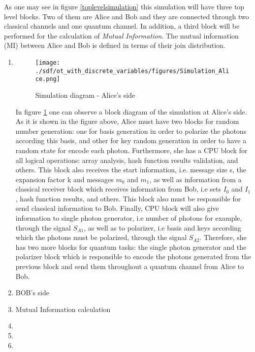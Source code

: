 As one may see in figure \ref{toplevelsimulation} this simulation will have three top level blocks. Two of them are Alice and Bob and they are connected through two classical channels and one quantum channel. In addition, a third block will be performed for the calculation of \textit{Mutual Information}. The mutual information (MI) between Alice and Bob is defined in terms of their join distribution.


\begin{enumerate}
  \item

  \begin{figure}[h]
	\centering
	\texttt{[image: ./sdf/ot\_with\_discrete\_variables/figures/Simulation\_Alice.png]}
	\caption{Simulation diagram - Alice's side}\label{simulationalice}
\end{figure}

    In figure \ref{simulationalice} one can observe a block diagram of the simulation at Alice's side. As it is shown in the figure above, Alice must have two blocks for random number generation: one for basis generation in order to polarize the photons according this basis, and other for key random generation in order to have a random state for encode each photon. Furthermore, she has a CPU block for all logical operations: array analysis, hash function results validation, and others. This block also receives the start information, i.e. message size s, the expansion factor k and messages $m_{0}$ and $m_{1}$, as well as information from a classical receiver block which receives information from Bob, i.e sets $I_{0}$ and $I_{1}$, hash function results, and others. This block also must be responsible for send classical information to Bob. Finally, CPU block will also give information to single photon generator, i.e number of photons for example, through the signal $S_{A1}$, as well as to polarizer, i.e basis and keys according which the photons must be polarized, through the signal $S_{A2}$. Therefore, she has two more blocks for quantum tasks: the single photon generator and the polarizer block which is responsible to encode the photons generated from the previous block and send them throughout a quantum channel from Alice to Bob.

  \item BOB's side
  \item Mutual Information calculation
  \item
  \item
  \item
\end{enumerate}





